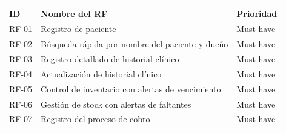 \documentclass[
]{article}
\newcounter{none} %
\begin{document}
{\def\LTcaptype{none} %
\begin{longtable}[]{@{}
  >{\raggedleft\arraybackslash}p{}
  >{\raggedright\arraybackslash}p{}
  >{\raggedright\arraybackslash}p{}@{}}
\toprule\noalign{}
\begin{minipage}[b]{\linewidth}\raggedleft
\textbf{ID}
\end{minipage} & \begin{minipage}[b]{\linewidth}\centering
\textbf{Nombre del RF}
\end{minipage} & \begin{minipage}[b]{\linewidth}\centering
\textbf{Prioridad}
\end{minipage} \\
\midrule\noalign{}
\endhead
\bottomrule\noalign{}
\endlastfoot
RF-01 & Registro de paciente &
\begin{minipage}[t]{\linewidth}\raggedright
Must have
\end{minipage} \\
RF-02 & Búsqueda rápida por nombre del paciente y dueño &
\begin{minipage}[t]{\linewidth}\raggedright
Must have
\end{minipage} \\
RF-03 & Registro detallado de historial clínico &
\begin{minipage}[t]{\linewidth}\raggedright
Must have
\end{minipage} \\
RF-04 & Actualización de historial clínico &
\begin{minipage}[t]{\linewidth}\raggedright
Must have
\end{minipage} \\
RF-05 & Control de inventario con alertas de vencimiento &
\begin{minipage}[t]{\linewidth}\raggedright
Must have
\end{minipage} \\
RF-06 & Gestión de stock con alertas de faltantes &
\begin{minipage}[t]{\linewidth}\raggedright
Must have
\end{minipage} \\
RF-07 & Registro del proceso de cobro &
\begin{minipage}[t]{\linewidth}\raggedright
Must have
\end{minipage} \\

\end{longtable}}
\end{document}
